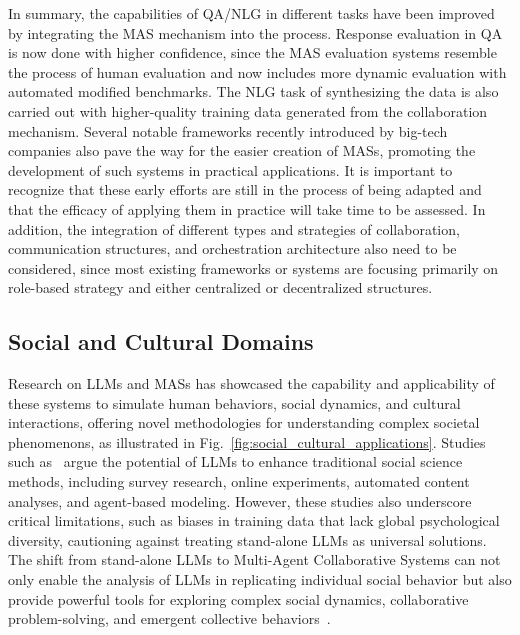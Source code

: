 \documentclass[acmsmall,nonacm]{acmart}
\begin{document}
    In summary, the capabilities of QA/NLG in different tasks have been improved by integrating the MAS mechanism into the process. Response evaluation in QA is now done with higher confidence, since the MAS evaluation systems resemble the process of human evaluation and now includes more dynamic evaluation with automated modified benchmarks. The NLG task of synthesizing the data is also carried out with higher-quality training data generated from the collaboration mechanism. Several notable frameworks recently introduced by big-tech companies also pave the way for the easier creation of MASs, promoting the development of such systems in practical applications. It is important to recognize that these early efforts are still in the process of being adapted and that the efficacy of applying them in practice will take time to be assessed. In addition, the integration of different types and strategies of collaboration, communication structures, and orchestration architecture also need to be considered, since most existing frameworks or systems are focusing primarily on role-based strategy and either centralized or decentralized structures.
    
        
    \subsection{Social and Cultural Domains}

        Research on LLMs and MASs has showcased the capability and applicability of these systems to simulate human behaviors, social dynamics, and cultural interactions, offering novel methodologies for understanding complex societal phenomenons, as illustrated in Fig.~\ref{fig:social_cultural_applications}. Studies such as~\cite{doi:10.1073/pnas.2314021121,10.1093/pnasnexus/pgae245} argue the potential of LLMs to enhance traditional social science methods, including survey research, online experiments, automated content analyses, and agent-based modeling. However, these studies also underscore critical limitations, such as biases in training data that lack global psychological diversity, cautioning against treating stand-alone LLMs as universal solutions. The shift from stand-alone LLMs to Multi-Agent Collaborative Systems can not only enable the analysis of LLMs in replicating individual social behavior but also provide powerful tools for exploring complex social dynamics, collaborative problem-solving, and emergent collective behaviors~\cite{Gao2024}.
\end{document}
